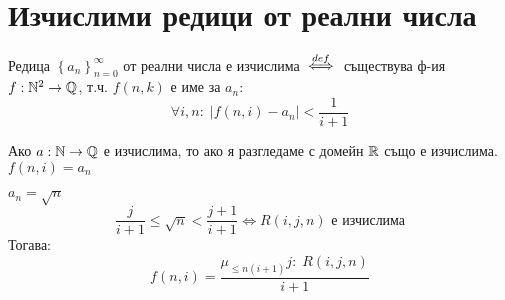 \section{Изчислими редици от реални числа}
\begin{definition}
    Редица $\left\{a_n\right\}_{n=0}^\infty$ от реални числа е изчислима ${\overset{def}{\iff}}$ съществува ф-ия $f: {\mathbb{N}}^2 \to {\mathbb{Q}}$, т.ч. $f(n, k)$ е име за $a_n$:
    \begin{equation*}
        \forall i, n:\; |f(n, i) - a_n| < \frac{1}{i+1}
    \end{equation*}
\end{definition}
\begin{example}
    Ако $a: {\mathbb{N}} \to {\mathbb{Q}}$ е изчислима, то ако я разгледаме с домейн ${\mathbb{R}}$ също е изчислима. $f(n, i) = a_n$
\end{example}
\begin{example}
    $a_n = \sqrt{n}$
    \begin{equation*}
        \frac{j}{i+1} \leq \sqrt{n} < \frac{j+1}{i+1} \iff R(i, j, n) \text{ е изчислима}
    \end{equation*}
    Тогава:
    \begin{equation*}
        f(n,i) = \frac{\mu_{\leq n(i+1)} j:\; R(i,j,n)}{i+1}
    \end{equation*}
\end{example}
